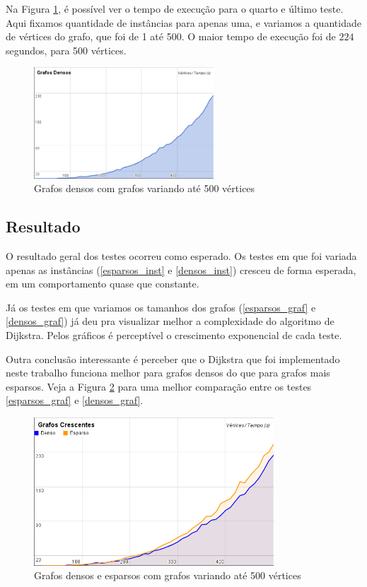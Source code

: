 \documentclass[12pt]{article}
\begin{document}
	Na Figura \ref{den_graf_var}, é possível ver o tempo de execução para o quarto e último teste. Aqui fixamos quantidade de instâncias para apenas uma, e variamos a quantidade de vértices do grafo, que foi de 1 até 500. O maior tempo de execução foi de $224$ segundos, para 500 vértices.

\begin{figure}[h!]
	\centering
	\includegraphics[width=0.60\textwidth]{graph_denso_grafvar.png}
	\caption{Grafos densos com grafos variando até 500 vértices}
	\label{den_graf_var}
\end{figure}

\subsection{Resultado}

	O resultado geral dos testes ocorreu como esperado. Os testes em que foi variada apenas as instâncias (\ref{esparsos_inst} e \ref{densos_inst}) cresceu de forma esperada, em um comportamento quase que constante.

    Já os testes em que variamos os tamanhos dos grafos (\ref{esparsos_graf} e \ref{densos_graf}) já deu pra visualizar melhor a complexidade do algoritmo de Dijkstra. Pelos gráficos é perceptível o crescimento exponencial de cada teste.

    Outra conclusão interessante é perceber que o Dijkstra que foi implementado neste trabalho funciona melhor para grafos densos do que para grafos mais esparsos. Veja a Figura \ref{graf_var} para uma melhor comparação entre os testes \ref{esparsos_graf} e \ref{densos_graf}.

    \begin{figure}[h!]
        \centering
        \includegraphics[width=0.80\textwidth]{graph_grafvar.png}
        \caption{Grafos densos e esparsos com grafos variando até 500 vértices}
        \label{graf_var}
    \end{figure}
\end{document}
